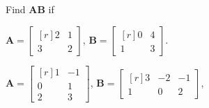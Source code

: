 
%
%
%

	Find $\mathbf{AB}$ if
	\begin{subproblem}
		\item $\mathbf{A} = \begin{bmatrix*}[r] 2 & 1 \\ 3 & 2 \end{bmatrix*}$,
			  $\mathbf{B} = \begin{bmatrix*}[r] 0 & 4 \\ 1 & 3 \end{bmatrix*}$.
		\item $\mathbf{A} = \begin{bmatrix*}[r] 1 &-1 \\ 0 & 1 \\ 2 & 3 \end{bmatrix*}$,
			  $\mathbf{B} = \begin{bmatrix*}[r] 3 &-2 &-1 \\ 1 & 0 & 2 \end{bmatrix*}$,
	\end{subproblem}

